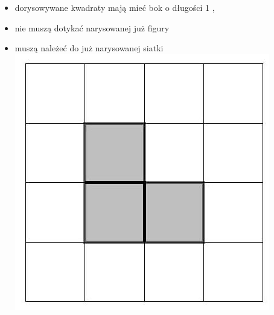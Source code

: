 \documentclass[10pt]{article}
\begin{document}
\begin{itemize}
  \item dorysowywane kwadraty mają mieć bok o długości 1 ,
  \item nie muszą dotykać narysowanej już figury
  \item muszą należeć do już narysowanej siatki\\
\includegraphics[max width=\textwidth, center]{2024_11_21_e9b4faa005d5be2cc318g-154}
\end{itemize}
\end{document}
